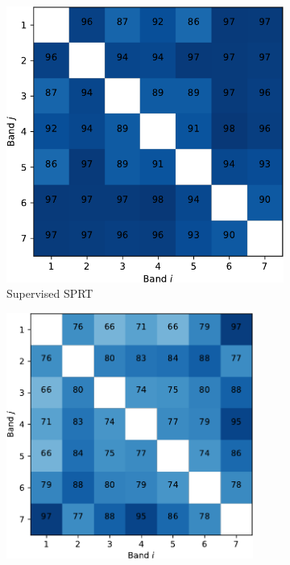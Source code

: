 \documentclass{article}
\begin{document}
\begin{figure}[h] 
  \begin{subfigure}[b]{0.5\linewidth}
    \centering
    \includegraphics[width=0.89\linewidth]{sup-crop.pdf} 
    \caption{Supervised SPRT} 
    \label{fig7:a} 
  \end{subfigure}%
  \begin{subfigure}[b]{0.5\linewidth}
    \centering
    \includegraphics[width=0.89\textwidth]{un-crop.pdf} 

\end{subfigure}
\end{figure}
\end{document}
